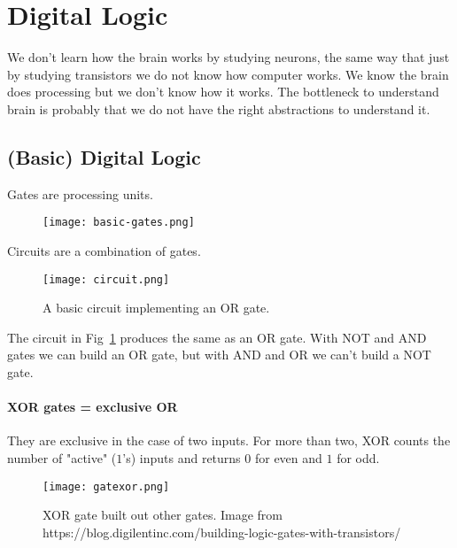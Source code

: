 \documentclass[main]{subfiles}
\begin{document}

\section{Digital Logic}

We don't learn how the brain works by studying neurons, the same way that just by studying transistors we do not know how computer works.
We know the brain does processing but we don't know how it works. The bottleneck to understand brain is probably that we do not have the right abstractions to understand it.

\subsection{(Basic) Digital Logic}

Gates are processing units.

\begin{figure}[H]
	\centering
	\texttt{[image: basic-gates.png]}
\end{figure}

Circuits are a combination of gates.

\begin{figure}[H]
	\centering
	\texttt{[image: circuit.png]}
	\label{fig:circuit-gates}
	\caption{A basic circuit implementing an OR gate.}
\end{figure}

The circuit in Fig~\ref{fig:circuit-gates} produces the same as an OR gate. With NOT and AND gates we can build an OR gate, but with AND and OR we can't build a NOT gate.

\paragraph{XOR gates = exclusive OR}
They are exclusive in the case of two inputs. For more than two, XOR counts the number of "active" ($1$'s) inputs and returns $0$ for even and $1$ for odd.

\begin{figure}[H]
	\centering
	\texttt{[image: gatexor.png]}
	\caption{XOR gate built out other gates. Image from https://blog.digilentinc.com/building-logic-gates-with-transistors/}
\end{figure}
\end{document}
